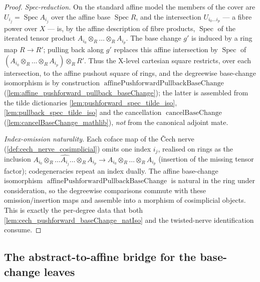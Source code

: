 \begin{proof}
  \emph{Spec-reduction.} On the standard affine model the members of the cover are
  \(U_{i_j} = \operatorname{Spec} A_{i_j}\) over the affine base \(\operatorname{Spec} R\),
  and the intersection \(U_{i_0\dots i_p}\) --- a fibre power over \(X\) --- is, by the
  affine description of fibre products, \(\operatorname{Spec}\) of the iterated tensor
  product \(A_{i_0} \otimes_R \dots \otimes_R A_{i_p}\). The base change \(g'\) is
  induced by a ring map \(R \to R'\); pulling back along \(g'\) replaces this affine
  intersection by \(\operatorname{Spec}\) of \((A_{i_0} \otimes_R \dots \otimes_R A_{i_p})
  \otimes_R R'\). Thus the X-level cartesian square restricts, over each intersection, to
  the affine pushout square of rings, and the degreewise base-change isomorphism is by
  construction \(\operatorname{affinePushforwardPullbackBaseChange}\)
  (\cref{lem:affine_pushforward_pullback_baseChange}); the latter is assembled from the
  tilde dictionaries \cref{lem:pushforward_spec_tilde_iso}, \cref{lem:pullback_spec_tilde_iso}
  and the cancellation \(\operatorname{cancelBaseChange}\)
  (\cref{lem:cancelBaseChange_mathlib}), \emph{not} from the canonical adjoint mate.

  \emph{Index-omission naturality.} Each coface map of the {\v C}ech nerve
  (\cref{def:cech_nerve_cosimplicial}) omits one index \(i_j\), realised on rings as the
  inclusion \(A_{i_0} \otimes_R \dots \widehat{A_{i_j}} \dots \otimes_R A_{i_p} \to
  A_{i_0} \otimes_R \dots \otimes_R A_{i_p}\) (insertion of the missing tensor factor);
  codegeneracies repeat an index dually. The affine base-change isomorphism
  \(\operatorname{affinePushforwardPullbackBaseChange}\) is natural in the ring under
  consideration, so the degreewise comparisons commute with these omission/insertion
  maps and assemble into a morphism of cosimplicial objects. This is exactly the
  per-degree data that both \cref{lem:cech_pushforward_baseChange_natIso} and the
  twisted-nerve identification consume.
\end{proof}

\subsection{The abstract-to-affine bridge for the base-change leaves}
\label{sec:pushpull_tilde_bridge}

